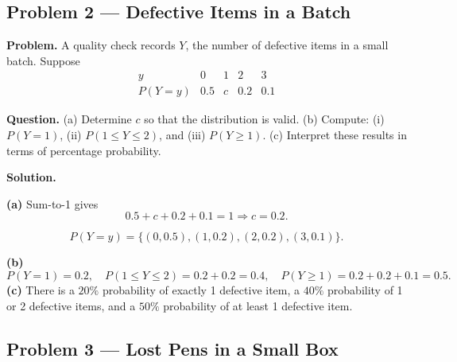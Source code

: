 \begin{ExamProblems}
		
		\item
		\subsection*{Problem 2 — Defective Items in a Batch}
		
		\textbf{Problem.}
		A quality check records $Y$, the number of defective items in a small batch. Suppose
		\[
		\begin{array}{c|cccc}
			y & 0 & 1 & 2 & 3\\
			\hline
			P(Y=y) & 0.5 & c & 0.2 & 0.1
		\end{array}
		\]
		
		\textbf{Question.}
		(a) Determine $c$ so that the distribution is valid.
		(b) Compute: (i) $P(Y=1)$, (ii) $P(1\le Y\le 2)$, and (iii) $P(Y\ge 1)$.
		(c) Interpret these results in terms of percentage probability.
		
		\textbf{Solution.}

		\textbf{(a)} Sum-to-1 gives
		\[
		0.5+c+0.2+0.1=1\Rightarrow c=0.2.
		\]

		
\[
		P(Y=y)=\{(0,0.5),(1,0.2),(2,0.2),(3,0.1)\}.
		\]
\begin{center}
		\end{center}
\textbf{(b)}
		\[
		P(Y=1)=0.2,\quad
		P(1\le Y\le 2)=0.2+0.2=0.4,\quad
		P(Y\ge 1)=0.2+0.2+0.1=0.5.
		\]
		\textbf{(c)} There is a $20\%$ probability of exactly 1 defective item, a $40\%$ probability of 1 or 2 defective items, and a $50\%$ probability of at least 1 defective item.
		
		
		\item
		\subsection*{Problem 3 — Lost Pens in a Small Box}
		

\end{ExamProblems}
